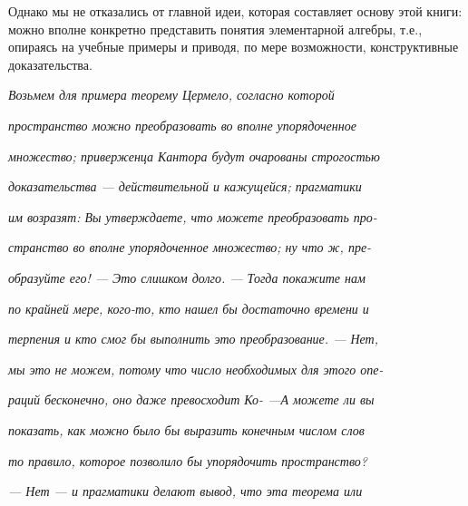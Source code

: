 {{   Однако мы не отказались от главной идеи, которая составляет основу этой книги: можно вполне конкретно представить понятия элементарной алгебры, т.е., опираясь на учебные примеры и приводя, по мере возможности, конструктивные доказательства.
   
\hspace{0.8in} \small  \textit {Возьмем для примера теорему Цермело, согласно которой}

\hspace{0.6in} \small  \textit {пространство можно преобразовать во вполне упорядоченное}

\hspace{0.6in} \small  \textit {множество; приверженца Кантора будут очарованы строгостью}

\hspace{0.6in} \small  \textit {доказательства — действительной и кажущейся; прагматики}

\hspace{0.6in} \small  \textit {им возразят: Вы утверждаете, что можете преобразовать про-}
\newpage

\hspace{0.6in} \small \textit {странство во вполне упорядоченное множество; ну что ж, пре-}

\hspace{0.6in} \small  \textit {образуйте его! — Это слишком долго. — Тогда покажите нам }

\hspace{0.6in} \small  \textit {по крайней мере, кого-то, кто нашел бы достаточно времени и }

\hspace{0.6in} \small  \textit {терпения и кто смог бы выполнить это преобразование. — Нет, }

\hspace{0.6in} \small  \textit {мы это не можем, потому что число необходимых для этого опе-}

\hspace{0.6in} \small  \textit {раций бесконечно, оно даже превосходит Ко- —А можете ли вы }

\hspace{0.6in} \small  \textit {показать, как можно было бы выразить конечным числом слов }

\hspace{0.6in} \small  \textit {то правило, которое позволило бы упорядочить пространство?} 

\hspace{0.6in} \small  \textit {— Нет — и прагматики делают вывод, что эта теорема или }

}}
